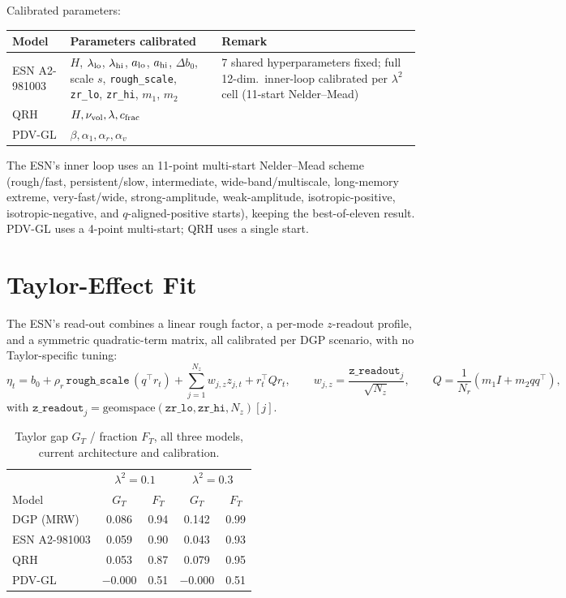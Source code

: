 \documentclass[11pt,a4paper]{article}
\begin{document}
Calibrated parameters:
\begin{center}\renewcommand{\arraystretch}{1.3}
\begin{tabular}{@{}p{3.0cm}p{6.4cm}p{5.0cm}@{}}\toprule
Model & Parameters calibrated & Remark \\\midrule
ESN A2-981003 & $H$, $\lambda_{\rm lo}$, $\lambda_{\rm hi}$, $a_{\rm lo}$,
  $a_{\rm hi}$, $\Delta b_0$, scale $s$, \texttt{rough\_scale},
  \texttt{zr\_lo}, \texttt{zr\_hi}, $m_1$, $m_2$ &
  7 shared hyperparameters fixed; full 12-dim.\ inner-loop calibrated
  per $\lambda^2$ cell (11-start Nelder--Mead) \\
QRH & $H,\nu_{\rm vol},\lambda,c_{\rm frac}$ & \\
PDV-GL & $\beta,\alpha_1,\alpha_r,\alpha_v$ & \\
\bottomrule\end{tabular}\end{center}
The ESN's inner loop uses an 11-point multi-start Nelder--Mead scheme
(rough/fast, persistent/slow, intermediate, wide-band/multiscale,
long-memory extreme, very-fast/wide, strong-amplitude, weak-amplitude,
isotropic-positive, isotropic-negative, and $q$-aligned-positive
starts), keeping the best-of-eleven result. PDV-GL uses a 4-point
multi-start; QRH uses a single start.

\section{Taylor-Effect Fit}
\label{sec:taylor-results}

The ESN's read-out combines a linear rough factor, a per-mode
$z$-readout profile, and a symmetric quadratic-term matrix, all
calibrated per DGP scenario, with no Taylor-specific tuning:
\begin{equation}
  \eta_t = b_0+\rho_r\,\texttt{rough\_scale}\,(q^\top r_t)
         +\sum_{j=1}^{N_z}w_{j,z}z_{j,t}+r_t^\top Qr_t,
  \qquad w_{j,z}=\frac{\texttt{z\_readout}_j}{\sqrt{N_z}},
  \qquad Q=\frac{1}{N_r}(m_1I+m_2qq^\top),
  \label{eq:coupling_v8}
\end{equation}
with $\texttt{z\_readout}_j=\mathrm{geomspace}(\texttt{zr\_lo},
\texttt{zr\_hi},N_z)[j]$.

\begin{table}[H]
\centering
\caption{Taylor gap $G_T$ / fraction $F_T$, all three models, current architecture and calibration.}
\begin{tabular}{@{}lcccc@{}}
\toprule
 & \multicolumn{2}{c}{$\lambda^2=0.1$} & \multicolumn{2}{c}{$\lambda^2=0.3$}\\
Model & $G_T$ & $F_T$ & $G_T$ & $F_T$ \\
\midrule
DGP (MRW) & 0.086 & 0.94 & 0.142 & 0.99 \\
\midrule
ESN A2-981003 & 0.059 & 0.90 & 0.043 & 0.93 \\
QRH & 0.053 & 0.87 & 0.079 & 0.95 \\
PDV-GL & $-0.000$ & 0.51 & $-0.000$ & 0.51 \\
\bottomrule
\end{tabular}
\end{table}
\end{document}
